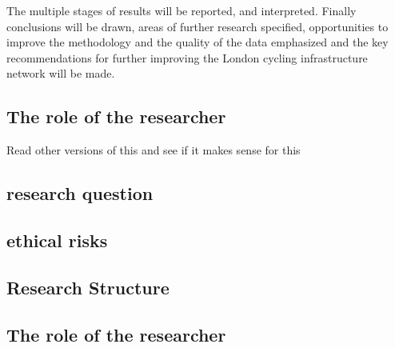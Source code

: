 The multiple stages of results will be reported, and interpreted. Finally conclusions will be drawn, areas of further research specified, opportunities to improve the methodology and the quality of the data emphasized and the key recommendations for further improving the London cycling infrastructure network will be made. 


\subsection{The role of the researcher}

Read other versions of this and see if it makes sense for this 



\subsection{research question}

\subsection{ethical risks}

\subsection{Research Structure}

\subsection{The role of the researcher}


